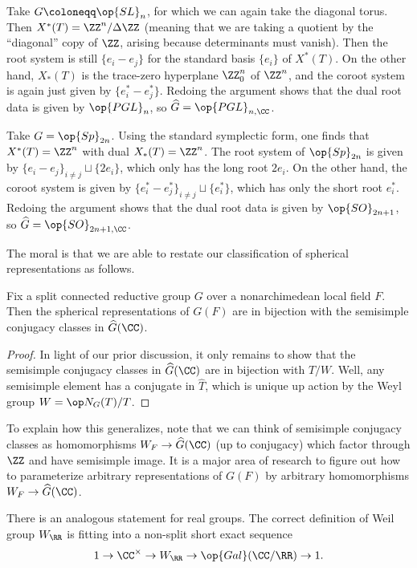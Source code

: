 \documentclass[../notes.tex]{subfiles}
\begin{document}
\begin{example}
	Take $G\coloneqq\op{SL}_n$, for which we can again take the diagonal torus. Then $X^*(T)=\ZZ^n/\Delta\ZZ$ (meaning that we are taking a quotient by the ``diagonal'' copy of $\ZZ$, arising because determinants must vanish). Then the root system is still $\{e_i-e_j\}$ for the standard basis $\{e_i\}$ of $X^*(T)$. On the other hand, $X_*(T)$ is the trace-zero hyperplane $\ZZ^n_0$ of $\ZZ^n$, and the coroot system is again just given by $\{e_i^*-e_j^*\}$. Redoing the argument shows that the dual root data is given by $\op{PGL}_n$, so $\widehat G=\op{PGL}_{n,\CC}$.
\end{example}
\begin{example}
	Take $G=\op{Sp}_{2n}$. Using the standard symplectic form, one finds that $X^*(T)=\ZZ^n$ with dual $X_*(T)=\ZZ^n$. The root system of $\op{Sp}_{2n}$ is given by $\{e_i-e_j\}_{i\ne j}\sqcup\{2e_i\}$, which only has the long root $2e_i$. On the other hand, the coroot system is given by $\{e_i^*-e_j^*\}_{i\ne j}\sqcup\{e_i^*\}$, which has only the short root $e_i^*$. Redoing the argument shows that the dual root data is given by $\op{SO}_{2n+1}$, so $\widehat G=\op{SO}_{2n+1,\CC}$.
\end{example}
The moral is that we are able to restate our classification of spherical representations as follows.
\begin{theorem}
	Fix a split connected reductive group $G$ over a nonarchimedean local field $F$. Then the spherical representations of $G(F)$ are in bijection with the semisimple conjugacy classes in $\widehat G(\CC)$.
\end{theorem}
\begin{proof}
	In light of our prior discussion, it only remains to show that the semisimple conjugacy classes in $\widehat G(\CC)$ are in bijection with $\widehat T/W$. Well, any semisimple element has a conjugate in $\widehat T$, which is unique up action by the Weyl group $W=\op N_G(T)/T$.
\end{proof}
\begin{remark}
	To explain how this generalizes, note that we can think of semisimple conjugacy classes as homomorphisms $W_F\to\widehat G(\CC)$ (up to conjugacy) which factor through $\ZZ$ and have semisimple image. It is a major area of research to figure out how to parameterize arbitrary representations of $G(F)$ by arbitrary homomorphisms $W_F\to\widehat G(\CC)$.
\end{remark}
\begin{remark}
	There is an analogous statement for real groups. The correct definition of Weil group $W_\RR$ is fitting into a non-split short exact sequence
	\[1\to\CC^\times\to W_\RR\to\op{Gal}(\CC/\RR)\to1.\]
\end{remark}
\end{document}
